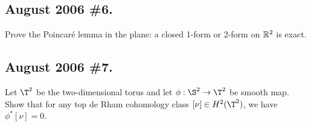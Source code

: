\documentclass[10pt]{article}
\numberwithin{equation}{subsection}
\begin{document}
%
%

\subsection{August 2006 \#6.}
\label{sec:A06.6}
Prove the Poincar\'e lemma in the plane:  a closed 1-form
or 2-form on $\mathbb{R}^2$ is exact.

\subsection{August 2006 \#7.}
Let $\T^2$ be the two-dimensional torus and let $\phi:\S^2\to \T^2$ be
 smooth map.  Show that for any top de Rham cohomology class $[\nu] \in
H^2(\T^2)$, we have $\phi^*[\nu] = 0$.
\end{document}
